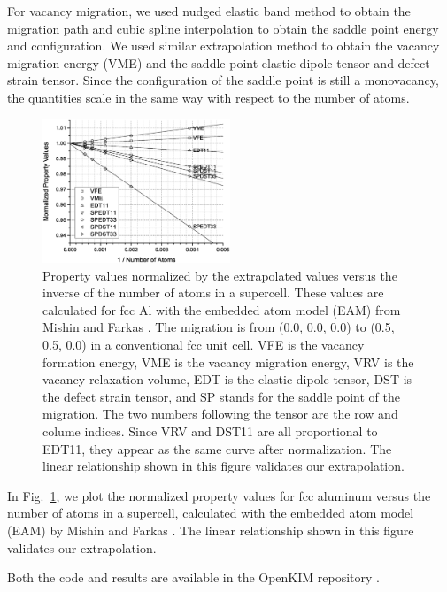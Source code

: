 \documentclass[%
 reprint,
 amsmath,amssymb,
 aps,
]{revtex4-1}
\begin{document}
For vacancy migration, we used nudged elastic band method to obtain the migration path and cubic spline interpolation to obtain the saddle point energy and configuration.
We used similar extrapolation method to obtain the vacancy migration energy (VME) and the saddle point elastic dipole tensor and defect strain tensor.
Since the configuration of the saddle point is still a monovacancy, the quantities scale in the same way with respect to the number of atoms.

\begin{figure}
\centering
\includegraphics[width=0.5\textwidth, clip, trim = 10mm 10mm 10mm 10mm]{extrapolation2}%
\caption{\label{fig:extrapolation}
Property values normalized by the extrapolated values versus the inverse of the number of atoms in a supercell.
These values are calculated for fcc Al with the embedded atom model (EAM) from Mishin and Farkas \cite{mishin1999interatomic}.
The migration is from (0.0, 0.0, 0.0) to (0.5, 0.5, 0.0) in a conventional fcc unit cell.
VFE is the vacancy formation energy, VME is the vacancy migration energy, VRV is the vacancy relaxation volume, EDT is the elastic dipole tensor, DST is the defect strain tensor, and SP stands for the saddle point of the migration.
The two numbers following the tensor are the row and colume indices.
Since VRV and DST11 are all proportional to EDT11, they appear as the same curve after normalization.
The linear relationship shown in this figure validates our extrapolation.
}
\end{figure}

In Fig.~\ref{fig:extrapolation}, we plot the normalized property values for fcc aluminum versus the number of atoms in a supercell, calculated with the embedded atom model (EAM) by Mishin and Farkas \cite{mishin1999interatomic}.
The linear relationship shown in this figure validates our extrapolation.

Both the code and results are available in the OpenKIM repository \cite{openkim2016}.
\end{document}
